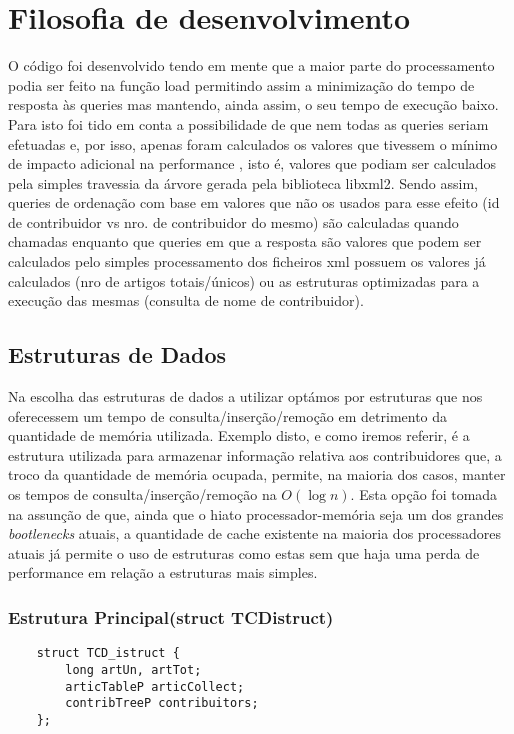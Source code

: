 \documentclass{report}
\begin{document}
\section{Filosofia de desenvolvimento}
O código foi desenvolvido tendo em mente que a maior parte do processamento podia ser feito na função load permitindo assim a minimização do tempo de resposta às queries mas mantendo, ainda assim, o seu tempo de execução baixo. Para isto foi tido em conta a possibilidade de que nem todas as queries seriam efetuadas e, por isso, apenas foram calculados os valores que tivessem o mínimo de impacto adicional na performance , isto é, valores que podiam ser calculados pela simples travessia da árvore gerada pela biblioteca libxml2. Sendo assim, queries de ordenação com base em valores que não os usados para esse efeito (id de contribuidor vs nro. de contribuidor do mesmo) são calculadas quando chamadas enquanto que queries em que a resposta são valores que podem ser calculados pelo simples processamento dos ficheiros xml possuem os valores já calculados (nro de artigos totais/únicos) ou as estruturas optimizadas para a execução das mesmas (consulta de nome de contribuidor).

\subsection{Estruturas de Dados}
Na escolha das estruturas de dados a utilizar optámos por estruturas que nos oferecessem um tempo de consulta/inserção/remoção em detrimento da quantidade de memória utilizada. Exemplo disto, e como iremos referir, é a estrutura utilizada para armazenar informação relativa aos contribuidores que, a troco da quantidade de memória ocupada, permite, na maioria dos casos, manter os tempos de consulta/inserção/remoção na $O(\log{}n)$. Esta opção foi tomada na assunção de que, ainda que o hiato processador-memória seja um dos grandes \textit{bootlenecks} atuais, a quantidade de cache existente na maioria dos processadores atuais já permite o uso de estruturas como estas sem que haja uma perda de performance em relação a estruturas mais simples.

\subsubsection{Estrutura Principal(struct TCDistruct)}

\begin{verbatim}
    struct TCD_istruct {
        long artUn, artTot;
        articTableP articCollect;
        contribTreeP contribuitors;
    };
\end{verbatim}
\end{document}
